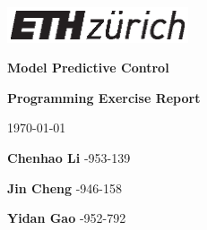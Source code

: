 \begin{titlepage}
    \begin{center}
        \vspace*{5cm}
        
        \includegraphics[width=0.4\textwidth]{logo/eth.eps}
        
        \vspace*{1cm}
        
        \huge
        \textbf{Model Predictive Control}
        
        \LARGE
        \textbf{Programming Exercise Report}
            
        \vspace*{1cm}
        
        \vfill
        
        \large
        \today
        
        \vspace*{1cm}
        
        \large
        \textbf{Chenhao Li} -953-139 \quad \href{mailto:chenhli@student.ethz.ch}{}
        
        \textbf{Jin Cheng} -946-158 \quad \href{mailto:jicheng@student.ethz.ch}{}
        
        \textbf{Yidan Gao} -952-792 \quad \href{mailto:yidgao@student.ethz.ch}{}
        

    \end{center}
\end{titlepage}